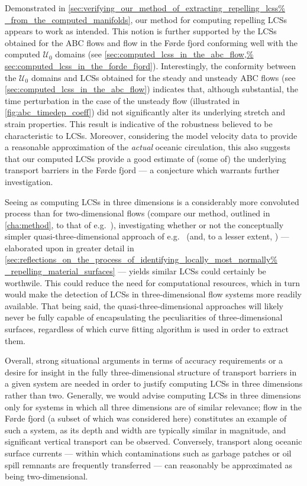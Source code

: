 Demonstrated in \cref{sec:verifying_our_method_of_extracting_repelling_lcss%
_from_the_computed_manifolds}, our method for computing repelling LCSs appears
to work as intended. This notion is further supported by the LCSs obtained for
the ABC flows and flow in the Førde fjord conforming well with the computed
$\mathcal{U}_{0}$ domains (see \cref{sec:computed_lcss_in_the_abc_flow,%
sec:computed_lcss_in_the_forde_fjord}). Interestingly, the conformity between
the $\mathcal{U}_{0}$ domains and LCSs obtained for the steady and unsteady ABC
flows (see \cref{sec:computed_lcss_in_the_abc_flow}) indicates that,
although substantial, the time perturbation in the case of the unsteady flow
(illustrated in \cref{fig:abc_timedep_coeff}) did not significantly alter its
underlying stretch and strain properties. This result is indicative of the
robustness believed to be characteristic to LCSs. Moreover, considering the
model velocity data to provide a reasonable approximation of the \emph{actual}
oceanic circulation, this also suggests that our computed LCSs provide a good
estimate of (some of) the underlying transport barriers in the Førde fjord ---
a conjecture which warrants further investigation.

Seeing as computing LCSs in three dimensions is a considerably more convoluted
process than for two-dimensional flows (compare our method, outlined in
\cref{cha:method}, to that of e.g.\ \textcite{loken2017sensitivity}),
investigating whether or not the conceptually simpler quasi-three-dimensional
approach of e.g.\ \textcite{blazevski2014hyperbolic} (and, to a lesser
extent, \textcite{oettinger2016autonomous}) --- elaborated upon in
greater detail in
\cref{sec:reflections_on_the_process_of_identifying_locally_most_normally%
_repelling_material_surfaces} --- yields similar LCSs could certainly be
worthwile. This could reduce the need for computational resources, which in
turn would make the detection of LCSs in three-dimensional flow systems more
readily available. That being said, the quasi-three-dimensional approaches will
likely never be fully capable of encapsulating the peculiarities of
three-dimensional surfaces, regardless of which curve fitting algorithm is used
in order to extract them.

Overall, strong situational arguments in terms of accuracy requirements or a
desire for insight in the fully three-dimensional structure of transport
barriers in a given system are needed in order to justify computing LCSs in
three dimensions rather than two. Generally, we would advise computing LCSs in
three dimensions only for systems in which all three dimensions are of similar
relevance; flow in the Førde fjord (a subset of which was considered here)
constitutes an example of such a system, as its depth and width are typically
similar in magnitude, and significant vertical transport can be observed.
Conversely, transport along oceanic surface currents --- within which
contaminations such as garbage patches or oil spill remnants are frequently
transferred --- can reasonably be approximated as being two-dimensional.

